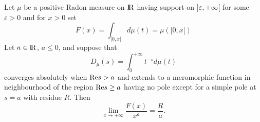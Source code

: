 \documentclass[12pt,a4paper]{amsart}
\begin{document}
\begin{theorem}\label{thm::Ikehara}
Let ${\mu}$ be a positive Radon measure on ${{\rm I\kern-.185em R}}$ having
support on $]\varepsilon,+\infty[$ for some $\varepsilon>0$
and for ${x}>0$ set
\begin{equation}\nonumber
	F({x})=\int_{[0,{x}[}d{\mu}({t})={\mu}([0,{x}[)
\end{equation}
Let $a\in{{\rm I\kern-.185em R}}$, $a\leq0$, and suppose that
\begin{equation}\nonumber
{D_{{\mu}}}({s})=
\int_0^{+\infty}{t}^{-{s}}d{\mu}({t})
\end{equation}
converges absolutely when ${\mathop{\rm Re}\nolimits}{s}>a$
and extends to a meromorphic function in neighbourhood of the
region ${\mathop{\rm Re}\nolimits}{s}\geq a$ having no pole
except for a simple pole at ${s}=a$
with residue $R$.
Then
\begin{equation}\nonumber
	\lim_{{x}\to+\infty}\frac{F({x})}{{x}^a}=
	\frac{R}{a}.
\end{equation}
\end{theorem}
\end{document}
